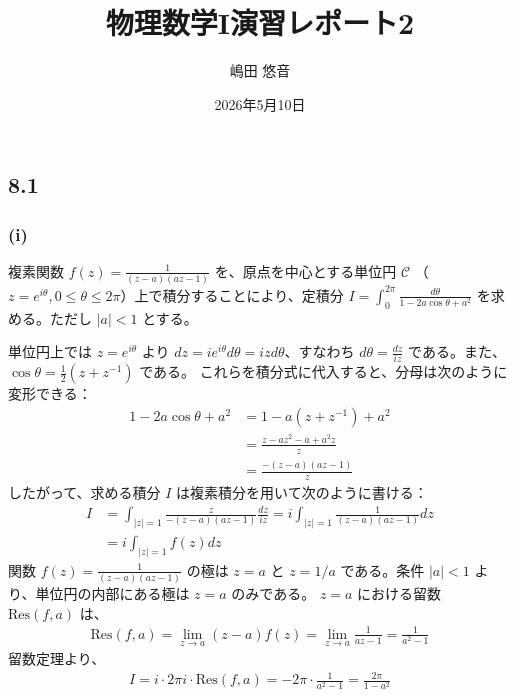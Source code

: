 \documentclass[platex,dvipdfmx,a4paper]{jsarticle}
\title{物理数学I演習レポート2}
\author{嶋田 悠音}
\date{2026年5月10日}
\begin{document}
  \maketitle
  \subsection*{8.1}

  \subsubsection*{(i)}
  複素関数 $f(z) = \frac{1}{(z-a)(az-1)}$ を、原点を中心とする単位円 $\mathcal{C}$ （$z = e^{i\theta}, 0 \le \theta \le 2\pi$）上で積分することにより、定積分 $I = \int_{0}^{2\pi}\frac{d\theta}{1-2a \cos \theta+a^{2}}$ を求める。ただし $|a| < 1$ とする。

  単位円上では $z = e^{i\theta}$ より $dz = i e^{i\theta} d\theta = iz d\theta$、すなわち $d\theta = \frac{dz}{iz}$ である。また、$\cos \theta = \frac{1}{2}(z + z^{-1})$ である。
  これらを積分式に代入すると、分母は次のように変形できる：
  \begin{align*}
  1 - 2a \cos \theta + a^2 &= 1 - a(z + z^{-1}) + a^2 \\
  &= \frac{z - az^2 - a + a^2z}{z} \\
  &= \frac{-(z-a)(az-1)}{z}
  \end{align*}
  したがって、求める積分 $I$ は複素積分を用いて次のように書ける：
  \begin{align*}
  I &= \int_{|z|=1} \frac{z}{-(z-a)(az-1)} \frac{dz}{iz} = i \int_{|z|=1} \frac{1}{(z-a)(az-1)} dz \\
  &= i \int_{|z|=1} f(z) dz
  \end{align*}
  関数 $f(z) = \frac{1}{(z-a)(az-1)}$ の極は $z = a$ と $z = 1/a$ である。条件 $|a| < 1$ より、単位円の内部にある極は $z = a$ のみである。
  $z = a$ における留数 $\text{Res}(f, a)$ は、
  \begin{align*}
  \text{Res}(f, a) = \lim_{z \to a} (z-a) f(z) = \lim_{z \to a} \frac{1}{az-1} = \frac{1}{a^2-1}
  \end{align*}
  留数定理より、
  \begin{align*}
  I = i \cdot 2\pi i \cdot \text{Res}(f, a) = -2\pi \cdot \frac{1}{a^2-1} = \frac{2\pi}{1-a^2}
  \end{align*}
\end{document}
